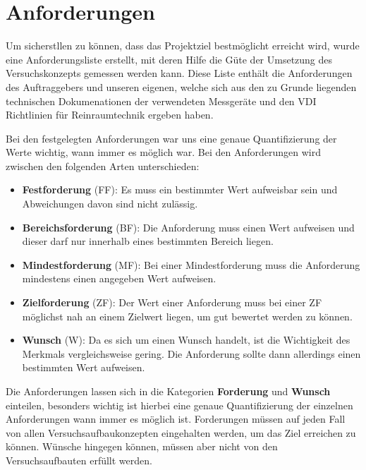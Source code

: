 \section{Anforderungen}
Um sicherstllen zu k\"{o}nnen, dass das Projektziel bestm\"{o}glicht erreicht wird, wurde eine Anforderungsliste erstellt, mit deren Hilfe die G\"{u}te der Umsetzung des Versuchskonzepts gemessen werden kann. Diese Liste enth\"{a}lt die Anforderungen des Auftraggebers und unseren eigenen, welche sich aus den zu Grunde liegenden technischen Dokumenationen der verwendeten Messger\"{a}te und den VDI Richtlinien f\"{u}r Reinraumtechnik ergeben haben.

Bei den festgelegten Anforderungen war uns eine genaue Quantifizierung der Werte wichtig, wann immer es m\"{o}glich war. Bei den Anforderungen wird zwischen den folgenden Arten unterschieden:

\begin{itemize}
	\item \textbf{Festforderung} (FF): Es muss ein bestimmter Wert aufweisbar sein und Abweichungen davon sind nicht zul\"{a}ssig.
	
	\item \textbf{Bereichsforderung} (BF): Die Anforderung muss einen Wert aufweisen und dieser darf nur innerhalb eines bestimmten Bereich liegen.
	
	\item \textbf{Mindestforderung} (MF): Bei einer Mindestforderung muss die Anforderung mindestens einen angegeben Wert aufweisen.
	
	\item \textbf{Zielforderung} (ZF): Der Wert einer Anforderung muss bei einer ZF m\"{o}glichst nah an einem Zielwert liegen, um gut bewertet werden zu k\"{o}nnen.
	
	\item \textbf{Wunsch} (W): Da es sich um einen Wunsch handelt, ist die Wichtigkeit des Merkmals vergleichsweise gering. Die Anforderung sollte dann allerdings einen bestimmten Wert aufweisen. 
\end{itemize} 

Die Anforderungen lassen sich in die Kategorien \textbf{Forderung} und \textbf{Wunsch} einteilen, besonders wichtig ist hierbei eine genaue Quantifizierung der einzelnen Anforderungen wann immer es m\"{o}glich ist. Forderungen m\"{u}ssen auf jeden Fall von allen Versuchsaufbaukonzepten eingehalten werden, um das Ziel erreichen zu k\"{o}nnen. W\"{u}nsche hingegen k\"{o}nnen, m\"{u}ssen aber nicht von den Versuchsaufbauten erf\"{u}llt werden.

